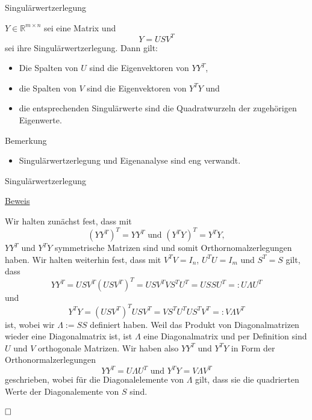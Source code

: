\documentclass[
  8pt,
  ignorenonframetext,
]{beamer}
\providecommand{\tightlist}{%
  \setlength{\itemsep}{0pt}\setlength{\parskip}{0pt}}
\begin{document}
\begin{frame}{Singulärwertzerlegung}
\protect\hypertarget{singuluxe4rwertzerlegung-1}{}
\small
\begin{theorem}
\justifying
\normalfont
$Y \in \mathbb{R}^{m \times n}$ sei eine Matrix und
\begin{equation}
Y = USV^T
\end{equation}
sei ihre Singulärwertzerlegung. Dann gilt:
\begin{itemize}
\item Die Spalten von $U$ sind die Eigenvektoren von $YY^T$,
\item die Spalten von $V$ sind die Eigenvektoren von $Y^TY$ und
\item die entsprechenden Singulärwerte sind die Quadratwurzeln der zugehörigen Eigenwerte.
\end{itemize}
\end{theorem}
\footnotesize

Bemerkung

\begin{itemize}
\tightlist
\item
  Singulärwertzerlegung und Eigenanalyse sind eng verwandt.
\end{itemize}
\end{frame}

\begin{frame}{Singulärwertzerlegung}
\protect\hypertarget{singuluxe4rwertzerlegung-2}{}
\footnotesize

\underline{Beweis} \vspace{1mm}

Wir halten zunächst fest, dass mit \begin{equation}
\left(YY^T\right)^T = YY^T \mbox{ und } \left(Y^TY\right)^T = Y^TY,
\end{equation} \(YY^T\) und \(Y^TY\) symmetrische Matrizen sind und
somit Orthornomalzerlegungen haben. Wir halten weiterhin fest, dass mit
\(V^TV = I_n\), \(U^TU = I_m\) und \(S^T = S\) gilt, dass
\begin{equation}
YY^T
= USV^T \left(USV^T\right)^T
= USV^TVS^TU^T
= USSU^T
=: U\Lambda U^T
\end{equation} und \begin{equation}
Y^TY
= \left(USV^T\right)^T USV^T
= VS^TU^T US^T V^T
=: V\Lambda V^T
\end{equation} ist, wobei wir \(\Lambda := SS\) definiert haben. Weil
das Produkt von Diagonalmatrizen wieder eine Diagonalmatrix ist, ist
\(\Lambda\) eine Diagonalmatrix und per Definition sind \(U\) und \(V\)
orthogonale Matrizen. Wir haben also \(YY^T\) und \(Y^TY\) in Form der
Orthonormalzerlegungen \begin{equation}
YY^T = U \Lambda U^T  \mbox{ und } Y^TY = V \Lambda V^T
\end{equation} geschrieben, wobei für die Diagonalelemente von
\(\Lambda\) gilt, dass sie die quadrierten Werte der Diagonalemente von
\(S\) sind.

\(\hfill \Box\)
\end{frame}
\end{document}

